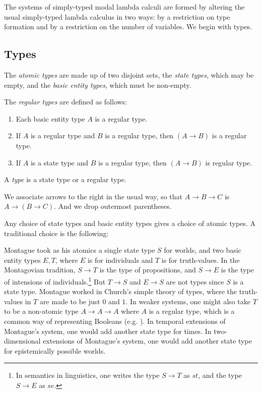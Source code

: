 \documentclass{lmcs} %
\begin{document}
The systems of simply-typed modal lambda calculi are formed by altering the usual simply-typed lambda calculus in two ways: by a restriction on type formation and by a restriction on the number of variables. We begin with types.




\subsection{Types}\label{subsec:typesandterms}

\begin{defi}[Types]\label{defn:type}
The \emph{atomic types} are made up of two disjoint sets, the \emph{state types}, which may be empty, and the \emph{basic entity types}, which must be non-empty.

The \emph{regular types} are defined as follows:
\begin{enumerate}[leftmargin=*]
    \item \label{type:definition:1} Each basic entity type $A$ is a regular type.
    \item \label{type:definition:2}  If $A$ is a regular type and $B$ is a regular type, then $(A\rightarrow B)$ is a regular type.
    \item \label{type:definition:3}  If $A$ is a state type and $B$ is a regular type, then $(A\rightarrow B)$ is regular type. 
\end{enumerate}
A \emph{type} is a state type or a regular type.  
\end{defi}

We associate arrows to the right in the usual way, so that $A\rightarrow B\rightarrow C$ is $A\rightarrow (B\rightarrow C)$. And we drop outermost parentheses.

Any choice of state types and basic entity types gives a choice of atomic types. A traditional choice is the following:

\begin{exa}\label{eqn:montagovianatomics}
Montague took as his atomics a single state type $S$ for worlds, and two basic entity types $E,T$, where $E$ is for individuals and $T$ is for truth-values. In the Montagovian tradition, $S\rightarrow T$ is the type of propositions, and $S\rightarrow E$ is the type of intensions of individuals.\footnote{In semantics in linguistics, one writes the type $S\rightarrow T$ as $st$, and the type $S\rightarrow E$ as $se$.} But $T\rightarrow S$ and $E\rightarrow S$ are not types since $S$ is a state type. Montague worked in Church's simple theory of types, where the truth-values in $T$ are made to be just $0$ and $1$. In weaker systems, one might also take $T$ to be a non-atomic type $A\rightarrow A\rightarrow A$ where $A$ is a regular type, which is a common way of representing Booleans (e.g. \cite[p. 39]{Barendregt2013-eb}). In temporal extensions of Montague's system, one would add another state type for times. In two-dimensional extensions of Montague's system, one would add another state type for epistemically possible worlds.
\end{exa}
\end{document}

